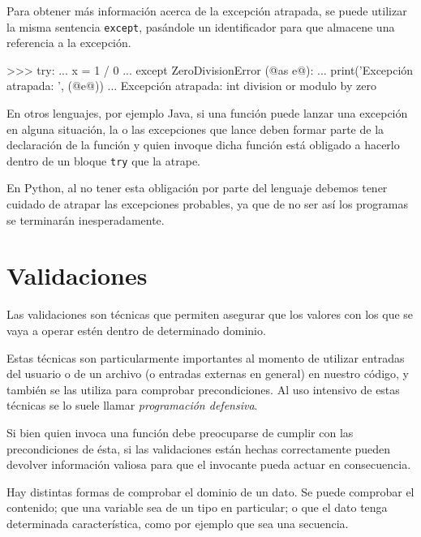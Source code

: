 Para obtener más información acerca de la excepción atrapada, se puede utilizar
la misma sentencia \lstinline!except!, pasándole un identificador para que
almacene una referencia a la excepción.

\begin{codigo-python-sn}
>>> try:
...     x = 1 / 0
... except ZeroDivisionError (@as e@):
...     print('Excepción atrapada: ', (@e@))
...
Excepción atrapada: int division or modulo by zero
\end{codigo-python-sn}


\begin{sabias_que}
En otros lenguajes, por ejemplo Java, si una función puede lanzar una
excepción en alguna situación, la o las excepciones que lance deben formar
parte de la declaración de la función y quien invoque dicha función está
obligado a hacerlo dentro de un bloque \lstinline!try! que la atrape.

En Python, al no tener esta obligación por parte del lenguaje debemos tener
cuidado de atrapar las excepciones probables, ya que de no ser así los
programas se terminarán inesperadamente.
\end{sabias_que}

\section{Validaciones}

Las validaciones son técnicas que permiten asegurar que los valores con los
que se vaya a operar estén dentro de determinado dominio.

Estas técnicas son particularmente importantes al momento de utilizar entradas
del usuario o de un archivo (o entradas externas en general) en nuestro
código, y también se las utiliza para comprobar precondiciones. Al
uso intensivo de estas técnicas se lo suele llamar \emph{programación
defensiva}.

Si bien quien invoca una función debe preocuparse de cumplir con las
precondiciones de ésta, si las validaciones están hechas correctamente pueden
devolver información valiosa para que el invocante pueda actuar en
consecuencia.

Hay distintas formas de comprobar el dominio de un dato. Se puede comprobar
el contenido; que una variable sea de un tipo en particular; o que el dato
tenga determinada característica, como por ejemplo que sea una secuencia.

